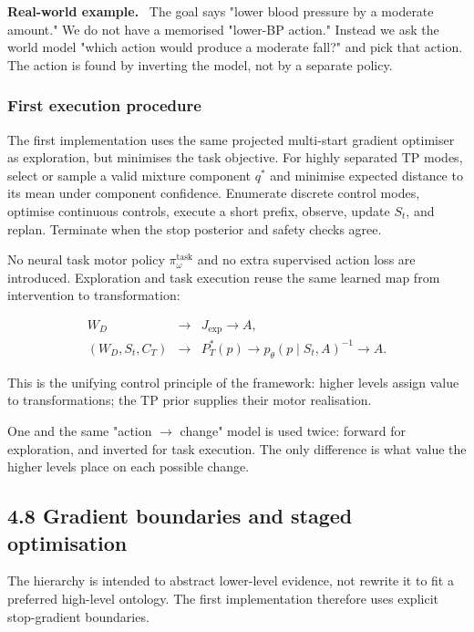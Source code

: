 \documentclass[11pt]{article}
\newenvironment{plainword}{%
  \par\medskip\noindent\begin{minipage}{\textwidth}%
  \color{gray!75!black}\small\itshape
}{%
  \end{minipage}\par\medskip}
\newenvironment{example}{%
  \par\smallskip\noindent\begin{minipage}{\textwidth}%
  \color{teal!60!black}\small
  \textbf{\color{teal!70!black}Real-world example.}\
}{%
  \end{minipage}\par\smallskip}
\begin{document}
\begin{example}
The goal says "lower blood pressure by a moderate amount." We do not have a memorised "lower-BP action." Instead we ask the world
model "which action would produce a moderate fall?" and pick that action. The action is found by inverting the model, not by a
separate policy.
\end{example}

\subsubsection*{First execution procedure}

The first implementation uses the same projected multi-start gradient optimiser as exploration, but minimises the task objective.
For highly separated TP modes, select or sample a valid mixture component $q^*$ and minimise expected distance to its mean under
component confidence. Enumerate discrete control modes, optimise continuous controls, execute a short prefix, observe, update $S_t$,
and replan. Terminate when the stop posterior and safety checks agree.

No neural task motor policy $\pi_{\omega}^{\mathrm{task}}$ and no extra supervised action loss are introduced. Exploration and task
execution reuse the same learned map from intervention to transformation:

\[
\boxed{
\begin{array}{rcl}
W_D&\rightarrow&J_{\mathrm{exp}}\rightarrow A,\\
(W_D,S_t,C_T)&\rightarrow&P_T^*(p)\rightarrow p_\theta(p\mid S_t,A)^{-1}\rightarrow A.
\end{array}}
\]

This is the unifying control principle of the framework: higher levels assign value to transformations; the TP prior supplies their
motor realisation.

\begin{plainword}
One and the same "action $\to$ change" model is used twice: forward for exploration, and inverted for task execution. The only
difference is what value the higher levels place on each possible change.
\end{plainword}

\subsection*{4.8 Gradient boundaries and staged optimisation}

The hierarchy is intended to abstract lower-level evidence, not rewrite it to fit a preferred high-level ontology. The first
implementation therefore uses explicit stop-gradient boundaries.
\end{document}
